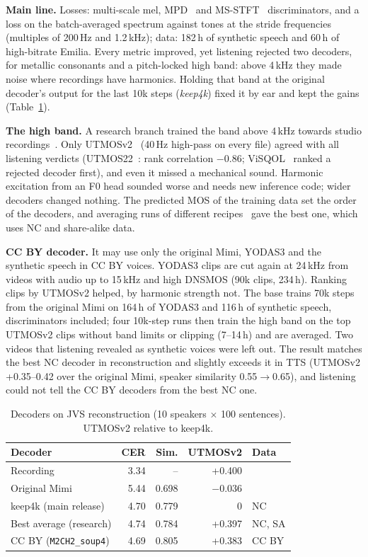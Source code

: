 \documentclass[10pt,a4paper,twocolumn]{article}
\begin{document}
\textbf{Main line.} Losses: multi-scale mel, MPD~\cite{hifigan} and MS-STFT~\cite{encodec}
discriminators, and a loss on the batch-averaged spectrum against tones at the stride frequencies
(multiples of 200\,Hz and 1.2\,kHz); data: 182\,h of synthetic speech and 60\,h of high-bitrate
Emilia. Every metric improved, yet listening rejected two decoders, for metallic consonants and a
pitch-locked high band: above 4\,kHz they made noise where recordings have harmonics. Holding that
band at the original decoder's output for the last 10k steps (\emph{keep4k}) fixed it by ear and
kept the gains (Table~\ref{tab:decoder}).

\textbf{The high band.} A research branch trained the band above 4\,kHz towards studio
recordings~\cite{hificaptain,jvnv}. Only UTMOSv2~\cite{utmosv2} (40\,Hz high-pass on every file)
agreed with all listening verdicts (UTMOS22~\cite{utmos}: rank correlation $-0.86$;
ViSQOL~\cite{visqol} ranked a rejected decoder first), and even it missed a mechanical sound. Harmonic
excitation from an F0 head sounded worse and needs new inference code; wider decoders changed
nothing. The predicted MOS of the training data set the order of the decoders, and averaging runs of
different recipes~\cite{soups} gave the best one, which uses NC and share-alike data.

\textbf{CC BY decoder.} It may use only the original Mimi, YODAS3 and the synthetic speech in CC BY
voices. YODAS3 clips are cut again at 24\,kHz from videos with audio up to 15\,kHz and high DNSMOS
(90k clips, 234\,h). Ranking clips by UTMOSv2 helped, by harmonic strength not. The base trains 70k steps from the original Mimi on 164\,h of YODAS3 and
116\,h of synthetic speech, discriminators included; four 10k-step runs then train the high band on
the top UTMOSv2 clips without band limits or clipping (7--14\,h) and are averaged. Two videos that listening revealed as synthetic
voices were left out. The result matches the best NC decoder in reconstruction and slightly exceeds
it in TTS (UTMOSv2 +0.35--0.42 over the original Mimi, speaker similarity 0.55$\to$0.65), and
listening could not tell the CC BY decoders from the best NC one.

\begin{table}[t]
\centering\footnotesize\setlength{\tabcolsep}{3pt}
\caption{Decoders on JVS reconstruction (10 speakers $\times$ 100 sentences). UTMOSv2 relative to
keep4k.}
\label{tab:decoder}
\begin{tabular}{@{}lrrrl@{}}
\toprule
Decoder & CER & Sim. & UTMOSv2 & Data\\
\midrule
Recording & 3.34 & -- & +0.400 &\\
Original Mimi & 5.44 & 0.698 & $-0.036$ &\\
keep4k (main release) & 4.70 & 0.779 & 0 & NC\\
Best average (research) & 4.74 & 0.784 & +0.397 & NC, SA\\
CC BY (\texttt{M2CH2\_soup4}) & 4.69 & 0.805 & +0.383 & CC BY\\
\bottomrule
\end{tabular}
\end{table}
\end{document}
